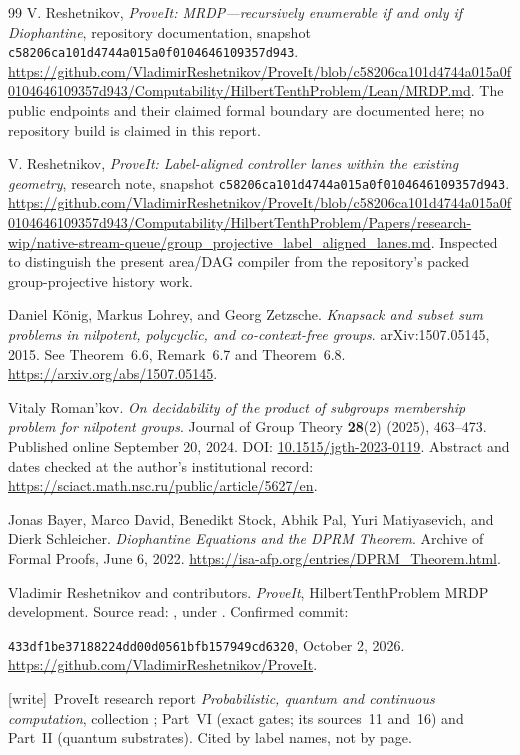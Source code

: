 \documentclass[11pt,letterpaper]{article}
\theoremstyle{definition}
\theoremstyle{remark}
\newcommand{\sha}{\texttt{c58206ca101d4744a015a0f0104646109357d943}}
\newcommand{\wtag}{\textup{[write]}}
\begin{document}
\begin{thebibliography}{99}
V. Reshetnikov, \emph{ProveIt: MRDP---recursively enumerable if and only if Diophantine}, repository documentation, snapshot \sha.
\url{https://github.com/VladimirReshetnikov/ProveIt/blob/c58206ca101d4744a015a0f0104646109357d943/Computability/HilbertTenthProblem/Lean/MRDP.md}.
The public endpoints and their claimed formal boundary are documented here; no repository build is claimed in this report.

V. Reshetnikov, \emph{ProveIt: Label-aligned controller lanes within the existing geometry}, research note, snapshot \sha.
\url{https://github.com/VladimirReshetnikov/ProveIt/blob/c58206ca101d4744a015a0f0104646109357d943/Computability/HilbertTenthProblem/Papers/research-wip/native-stream-queue/group_projective_label_aligned_lanes.md}.
Inspected to distinguish the present area/DAG compiler from the repository's packed group-projective history work.

Daniel K\"onig, Markus Lohrey, and Georg Zetzsche.
\emph{Knapsack and subset sum problems in nilpotent, polycyclic, and
co-context-free groups}. arXiv:1507.05145, 2015.
See Theorem~6.6, Remark~6.7 and Theorem~6.8.
\url{https://arxiv.org/abs/1507.05145}.

Vitaly Roman'kov.
\emph{On decidability of the product of subgroups membership problem for
nilpotent groups}. Journal of Group Theory \textbf{28}(2) (2025), 463--473.
Published online September 20, 2024.
DOI: \href{https://doi.org/10.1515/jgth-2023-0119}{10.1515/jgth-2023-0119}.
Abstract and dates checked at the author's institutional record:
\url{https://sciact.math.nsc.ru/public/article/5627/en}.

Jonas Bayer, Marco David, Benedikt Stock, Abhik Pal, Yuri Matiyasevich,
and Dierk Schleicher.
\emph{Diophantine Equations and the DPRM Theorem}.
Archive of Formal Proofs, June 6, 2022.
\url{https://isa-afp.org/entries/DPRM_Theorem.html}.

Vladimir Reshetnikov and contributors.
\emph{ProveIt}, HilbertTenthProblem MRDP development.
Source read: , under
.
Confirmed commit:\par\texttt{433df1be37188224dd00d0561bfb157949cd6320},
October 2, 2026.
\url{https://github.com/VladimirReshetnikov/ProveIt}.

\wtag\ ProveIt research report \emph{Probabilistic, quantum and continuous computation}, collection ; Part~VI (exact gates; its sources~11 and~16) and Part~II (quantum substrates). Cited by label names, not by page.


\end{thebibliography}
\end{document}

